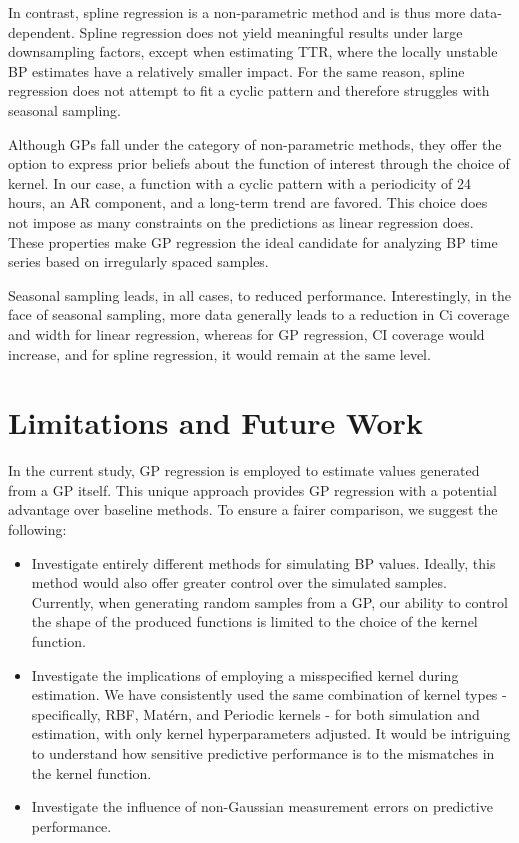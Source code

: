 In contrast, spline regression is a non-parametric method and is thus more data-dependent.
Spline regression does not yield meaningful results under large downsampling factors,
except when estimating TTR, where the locally unstable BP estimates have a relatively smaller impact.
For the same reason, spline regression does not attempt to fit a cyclic pattern and therefore struggles with seasonal sampling.

Although GPs fall under the category of non-parametric methods, they offer the option to express
prior beliefs about the function of interest through the choice of kernel.
In our case, a function with a cyclic pattern with a periodicity of 24 hours, an AR component, and a long-term trend are favored.
This choice does not impose as many constraints on the predictions as linear regression does.
These properties make GP regression the ideal candidate for analyzing BP time series based on irregularly spaced samples.


Seasonal sampling leads, in all cases, to reduced performance.
Interestingly, in the face of seasonal sampling, more data generally leads to
a reduction in Ci coverage and width for linear regression,
whereas for GP regression, CI coverage would increase,
and for spline regression, it would remain at the same level.


\section{Limitations and Future Work}

In the current study, GP regression is employed to estimate values generated from a GP itself.
This unique approach provides GP regression with a potential advantage over baseline methods.
To ensure a fairer comparison, we suggest the following:

\begin{itemize}
    \item Investigate entirely different methods for simulating BP values.
    Ideally, this method would also offer greater control over the simulated samples.
    Currently, when generating random samples from a GP, our ability to control the shape of the produced
    functions is limited to the choice of the kernel function.

    \item Investigate the implications of employing a misspecified kernel during estimation.
    We have consistently used the same combination of kernel types - specifically, RBF, Matérn, and Periodic kernels -
    for both simulation and estimation, with only kernel hyperparameters adjusted.
    It would be intriguing to understand how sensitive predictive performance is to the mismatches in
    the kernel function.

    \item Investigate the influence
    of non-Gaussian measurement errors on predictive performance.
\end{itemize}


